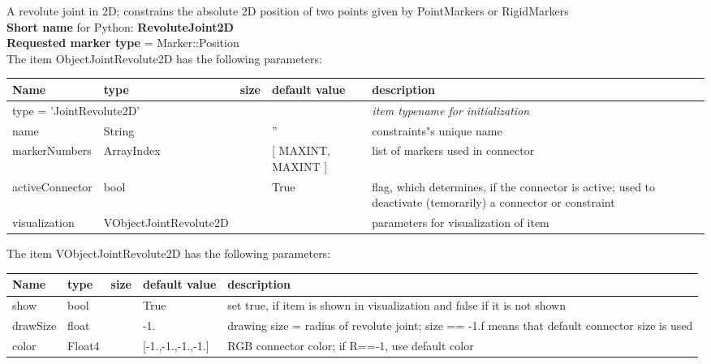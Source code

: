 A revolute joint in 2D; constrains the absolute 2D position of two points given by PointMarkers or RigidMarkers
 \\
{\bf Short name} for Python: {\bf RevoluteJoint2D}
 \\  {\bf Requested marker type} = Marker::Position \\ 
The item ObjectJointRevolute2D has the following parameters:
\begin{center}
  \footnotesize
  \begin{longtable}{| p{4.5cm} | p{2.5cm} | p{0.5cm} | p{2.5cm} | p{6cm} |}
    \hline
    \bf Name & \bf type & \bf size & \bf default value & \bf description \\ \hline
    \multicolumn{4}{l}{\parbox{10cm}{type = 'JointRevolute2D'}} & \multicolumn{1}{l}{\parbox{6cm}{\it item typename for initialization}}\\ \hline
    name &     String &      &     '' &     constraints"s unique name\\ \hline
    markerNumbers &     ArrayIndex &      &     [ MAXINT, MAXINT ] &     list of markers used in connector\\ \hline
    activeConnector &     bool &      &     True &     flag, which determines, if the connector is active; used to deactivate (temorarily) a connector or constraint\\ \hline
    visualization & VObjectJointRevolute2D & & & parameters for visualization of item \\ \hline
	  \end{longtable}
	\end{center}
The item VObjectJointRevolute2D has the following parameters:
\begin{center}
  \footnotesize
  \begin{longtable}{| p{4.5cm} | p{2.5cm} | p{0.5cm} | p{2.5cm} | p{6cm} |}
    \hline
    \bf Name & \bf type & \bf size & \bf default value & \bf description \\ \hline
    show &     bool &      &     True &     set true, if item is shown in visualization and false if it is not shown\\ \hline
    drawSize &     float &      &     -1. &     drawing size = radius of revolute joint; size == -1.f means that default connector size is used\\ \hline
    color &     Float4 &      &     [-1.,-1.,-1.,-1.] &     RGB connector color; if R==-1, use default color\\ \hline
	  \end{longtable}
	\end{center}

